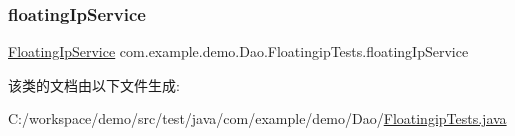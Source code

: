 \mbox{\label{classcom_1_1example_1_1demo_1_1_dao_1_1_floatingip_tests_a888ad6e7c6f1a13824c9293230016940}} 
\subsubsection{\texorpdfstring{floating\+Ip\+Service}{floatingIpService}}
{\footnotesize\ttfamily \mbox{\hyperlink{classcom_1_1example_1_1demo_1_1service_1_1_floating_ip_service}{Floating\+Ip\+Service}} com.\+example.\+demo.\+Dao.\+Floatingip\+Tests.\+floating\+Ip\+Service\hspace{0.3cm}{\ttfamily [package]}}



该类的文档由以下文件生成\+:\begin{DoxyCompactItemize}
\item 
C\+:/workspace/demo/src/test/java/com/example/demo/\+Dao/\mbox{\hyperlink{_floatingip_tests_8java}{Floatingip\+Tests.\+java}}\end{DoxyCompactItemize}
